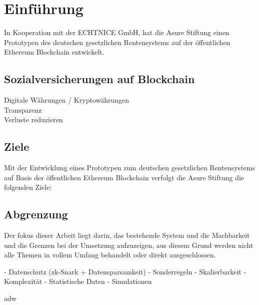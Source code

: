 \section{Einführung}
In Kooperation mit der ECHTNICE GmbH, hat die Asure Stiftung einen Prototypen des deutschen gesetzlichen Rentensystems auf der öffentlichen Ethereum Blockchain entwickelt.

\subsection{Sozialversicherungen auf Blockchain}
Digitale Währungen / Kryptowährungen\\
Transparenz\\
Verluste reduzieren\\

\subsection{Ziele}
Mit der Entwicklung eines Prototypen zum deutschen gesetzlichen Rentensystems auf Basis der öffentlichen Ethereum Blockchain verfolgt die Asure Stiftung die folgenden Ziele:

\subsection{Abgrenzung}

Der fokus dieser Arbeit liegt darin, das bestehende System und die Machbarkeit und die Grenzen bei der Umsetzung aufzuzeigen, aus diesem Grund werden nicht alle Themen in vollem Umfang behandelt oder direkt ausgeschlossen.

- Datenschutz (zk-Snark + Datensparsamkeit)
- Sonderregeln
- Skalierbarkeit
- Komplexität
- Statistische Daten
- Simulationen


adw \cite{noauthor_universal_2017}